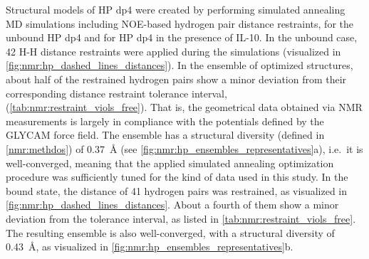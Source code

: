 Structural models of HP dp4 were created by performing simulated annealing MD
simulations including NOE-based hydrogen pair distance restraints, for the
unbound HP dp4 and for HP dp4 in the presence of IL-10. In the unbound case, 42
H-H distance restraints were applied during the simulations (visualized in
\cref{fig:nmr:hp_dashed_lines_distances}). In the ensemble of optimized
structures, about half of the restrained hydrogen pairs show a minor deviation
from their corresponding distance restraint tolerance interval,
(\cref{tab:nmr:restraint_viols_free}). That is, the geometrical data obtained
via NMR measurements is largely in compliance with the potentials defined by the
GLYCAM force field. The ensemble has a structural diversity (defined in
\cref{nmr:methdos}) of \SI{0.37}{\angstrom}
(see \cref{fig:nmr:hp_ensembles_representatives}a), i.e.\ it is well-converged,
meaning that the applied simulated annealing optimization procedure was
sufficiently tuned for the kind of data used in this study. In the bound state,
the distance of 41 hydrogen pairs was restrained, as visualized in
\cref{fig:nmr:hp_dashed_lines_distances}. About a fourth of them show a minor
deviation from the tolerance interval, as listed in
\cref{tab:nmr:restraint_viols_free}. The resulting ensemble is also
well-converged, with a structural diversity of \SI{0.43}{\angstrom}, as
visualized in \cref{fig:nmr:hp_ensembles_representatives}b.


